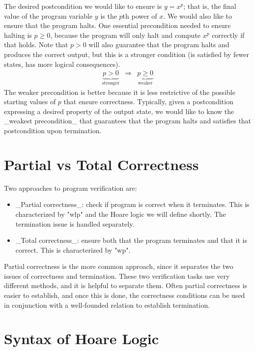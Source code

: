 \medskip\noindent
The desired postcondition we would like to ensure is $y=x^p$; that is, the
final value of the program variable $y$ is the $p$th power of $x$. We would
also like to ensure that the program halts. One
essential precondition needed to ensure halting is $p \ge 0$, because the program
will only halt and compute $x^p$ correctly if that holds. Note that $p \gt 0$ will also
guarantee that the program halts and produces the correct output,
but this is a stronger condition (is satisfied by fewer states, has more logical consequences).
\begin{eqnarray*}
\underbrace{p \gt 0}_{\mathrm{stronger}} &\Rightarrow& \underbrace{p \ge 0}_{\mathrm{weaker}}
\end{eqnarray*}
The weaker precondition is better because it is less restrictive of the
possible starting values of $p$ that ensure correctness. Typically, given a
postcondition expressing a desired property of the output state, we would
like to know the _weakest precondition_ that guarantees that the program
halts and satisfies that postcondition upon termination.

\section{Partial vs Total Correctness}

Two approaches to program verification are:
\begin{itemize}
\item _Partial correctness_: check if program is correct when it terminates. This is characterized by "wlp" and the Hoare logic we will define shortly. The termination issue is handled separately.
\item _Total correctness_: ensure both that the program terminates and that it is correct. This is characterized by "wp".
\end{itemize}
Partial correctness is the more common approach, since it separates the two issues of correctness and termination. These two verification tasks use very different methods, and it is helpful to separate them. Often partial correctness is easier to establish, and once this is done, the correctness conditions can be used in conjunction with a well-founded relation to establish termination.

\section{Syntax of Hoare Logic}

